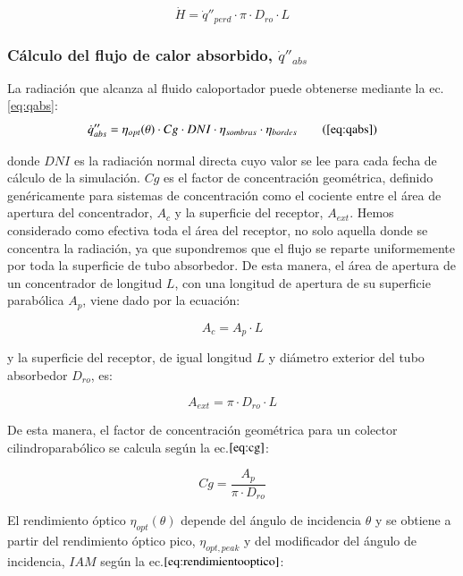 \begin{equation}
   \dot H =  \dot q''_{perd} \cdot \pi \cdot D_{ro} \cdot L
    \label{eq:delta_hvalornegativo}
\end{equation}

\subsubsection{Cálculo del flujo de calor absorbido, $\dot q''_{abs}$}

La radiación que alcanza al fluido caloportador puede obtenerse mediante la ec.\ref{eq:qabs}:
\begin{equation}
\notag \dot q''_{abs}= \eta_{opt}(\theta) \cdot Cg \cdot DNI \cdot \eta_{sombras} \cdot \eta_{bordes}  \tag{\ref{eq:qabs}}
\end{equation}

donde \(DNI\) es la radiación normal directa cuyo valor se lee para cada  fecha de cálculo de la simulación. \(Cg\) es el factor de concentración geométrica, definido genéricamente   para sistemas de concentración como el cociente entre el área de  apertura del concentrador, \(A_c\) y la superficie del receptor,   \(A_{ext}\). Hemos considerado como efectiva toda el área del receptor, no solo aquella donde se concentra la radiación, ya que supondremos que el flujo se reparte uniformemente por toda la superficie de tubo absorbedor. De esta manera, el área de apertura de un concentrador de longitud $L$, con una longitud de apertura de su superficie parabólica $A_p$, viene dado por la ecuación:

\begin{equation}
   A_c = A_p \cdot L
    \label{eq:aperturaconcentrador}
\end{equation}

y la superficie del receptor, de igual longitud $L$ y diámetro exterior del tubo absorbedor $D_{ro}$, es:

\begin{equation}
   A_{ext} = \pi \cdot D_{ro} \cdot L
    \label{eq:superficiereceptor}
\end{equation}

De esta manera,  el factor de concentración geométrica para un colector cilindroparabólico se calcula según la ec.\(\eqref{eq:cg}\):

\begin{equation}
   Cg = \frac{A_p}{\pi \cdot D_{ro}}
    \label{eq:cg}
\end{equation}


El rendimiento óptico \(\eta_{opt}(\theta)\)  depende del   ángulo de incidencia \(\theta\) y se obtiene a partir del rendimiento  óptico pico, \(\eta_{opt,peak}\) y del modificador del ángulo de   incidencia, \(IAM\) según la ec.\(\eqref{eq:rendimientooptico}\):


